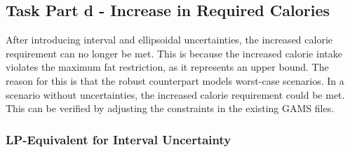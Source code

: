 \documentclass[a4paper,12pt]{article}
\begin{document}
\subsection*{Task Part d - Increase in Required Calories}

After introducing interval and ellipsoidal uncertainties, the increased calorie requirement can no longer be met. This is because the increased calorie intake violates the maximum fat restriction, as it represents an upper bound. The reason for this is that the robust counterpart models worst-case scenarios. In a scenario without uncertainties, the increased calorie requirement could be met.
This can be verified by adjusting the constraints in the existing GAMS files.

\newpage

\subsubsection*{LP-Equivalent for Interval Uncertainty}
\label{sec:lp-equivalent-interval}
\end{document}
